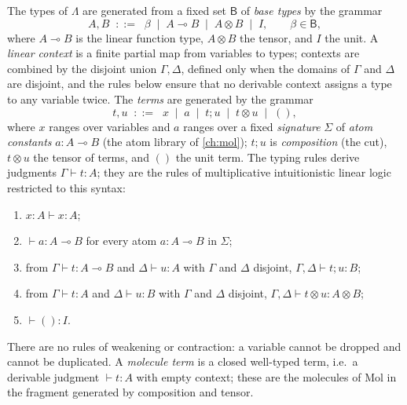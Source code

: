 \begin{definition}\label{def:lambda}
The types of $\Lambda$ are generated from a fixed set $\mathsf{B}$ of \emph{base types} by the grammar
\[
A, B \;\;::=\;\; \beta \;\mid\; A \multimap B \;\mid\; A \otimes B \;\mid\; I,
\qquad \beta \in \mathsf{B},
\]
where $A \multimap B$ is the linear function type, $A \otimes B$ the tensor, and $I$ the unit. A \emph{linear context} is a finite partial map from variables to types; contexts are combined by the disjoint union $\Gamma, \Delta$, defined only when the domains of $\Gamma$ and $\Delta$ are disjoint, and the rules below ensure that no derivable context assigns a type to any variable twice. The \emph{terms} are generated by the grammar
\[
t, u \;\;::=\;\; x \;\mid\; a \;\mid\; t ; u \;\mid\; t \otimes u \;\mid\; (),
\]
where $x$ ranges over variables and $a$ ranges over a fixed \emph{signature} $\Sigma$ of \emph{atom constants} $a : A \multimap B$ (the atom library of \autoref{ch:mol}); $t ; u$ is \emph{composition} (the cut), $t \otimes u$ the tensor of terms, and $()$ the unit term.
The typing rules derive judgments $\Gamma \vdash t : A$; they are the rules of multiplicative intuitionistic linear logic restricted to this syntax:
\begin{enumerate}
\item[(var)] $x : A \vdash x : A$;
\item[(atom)] $\vdash a : A \multimap B$ for every atom $a : A \multimap B$ in $\Sigma$;
\item[(comp)] from $\Gamma \vdash t : A \multimap B$ and $\Delta \vdash u : A$ with $\Gamma$ and $\Delta$ disjoint, $\Gamma, \Delta \vdash t ; u : B$;
\item[(tensor)] from $\Gamma \vdash t : A$ and $\Delta \vdash u : B$ with $\Gamma$ and $\Delta$ disjoint, $\Gamma, \Delta \vdash t \otimes u : A \otimes B$;
\item[(unit)] $\vdash () : I$.
\end{enumerate}
There are no rules of weakening or contraction: a variable cannot be dropped and cannot be duplicated. A \emph{molecule term} is a closed well-typed term, i.e.\ a derivable judgment $\vdash t : A$ with empty context; these are the molecules of Mol in the fragment generated by composition and tensor.
\end{definition}

